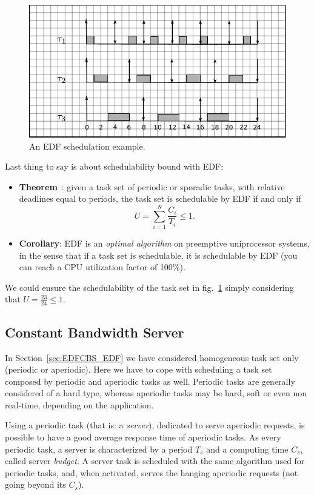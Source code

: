 \begin{figure}[htbp]
    \includegraphics[width=\columnwidth]{images/edf_example}
    \caption{An EDF schedulation example.}
    \label{fig:edf_example}
\end{figure}

Last thing to say is about schedulability bound with EDF:
\begin{itemize}
\item {\bf Theorem}~\cite{LiuL1973}: given a task set of periodic or
  sporadic tasks, with relative deadlines equal to periods, the task
  set is schedulable by EDF if and only if
$$
U = \sum_{i=1}^N \frac{C_{i}}{T_{i}} \leq 1.
$$ 
\item {\bf Corollary}: EDF is an \emph{optimal algorithm} on
  preemptive uniprocessor systems, in the sense that if a task set is
  schedulable, it is schedulable by EDF (you can reach a CPU
  utilization factor of 100\%).
\end{itemize}
We could ensure the schedulability of the task set in
fig.~\ref{fig:edf_example} simply considering that $U = \frac{23}{24}
\leq 1$.

\subsection{Constant Bandwidth Server\label{sec:EDFCBS_CBS}}

In Section~\ref{sec:EDFCBS_EDF} we have considered homogeneous task
set only (periodic or aperiodic). Here we have to cope with scheduling
a task set composed by periodic and aperiodic tasks as well. Periodic
tasks are generally considered of a hard type, whereas aperiodic tasks
may be hard, soft or even non real-time, depending on the application.

Using a periodic task (that is: a \emph{server}), dedicated to serve
aperiodic requests, is possible to have a good average response time
of aperiodic tasks. As every periodic task, a server is characterized
by a period $T_{s}$ and a computing time $C_{s}$, called server
\emph{budget}. A server task is scheduled with the same algorithm used
for periodic tasks, and, when activated, serves the hanging
aperiodic requests (not going beyond its $C_{s}$).

